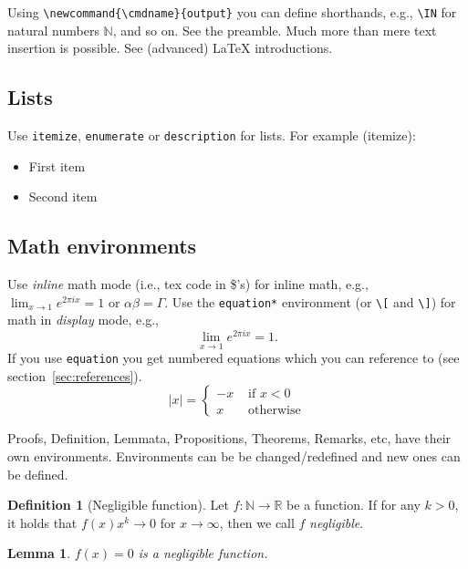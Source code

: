 \documentclass[11pt]{scrartcl}
\theoremstyle{plain} %
\newtheorem{lemma}[theorem]{Lemma}
\theoremstyle{definition} %
\newtheorem{definition}[theorem]{Definition}
\theoremstyle{remark} %
\newcommand{\IN}{\mathbb{N}} %
\newcommand{\IR}{\mathbb{R}} %
\begin{document}
Using \verb|\newcommand{\cmdname}{output}| you can define shorthands,
e.g., \verb|\IN| for natural numbers $\IN$, and so on.
See the preamble.
Much more than mere text insertion is possible.
See (advanced) \LaTeX{} introductions.

\subsection{Lists}
\label{subsec:lists}

Use \verb|itemize|, \verb|enumerate| or \verb|description| for lists.
For example (itemize):
\begin{itemize}
	\item First item
	\item Second item
\end{itemize}


\subsection{Math environments}
\label{subsec:math-env}

Use \emph{inline} math mode (i.e., tex code in \$'s) for inline math,
e.g., $\lim_{x \to 1} e^{2 \pi i x} = 1$ or $\alpha \beta = \Gamma$.
Use the \verb|equation*| environment (or \verb|\[| and \verb|\]|)
for math in \emph{display} mode, e.g.,
\begin{equation*}
	\lim_{x \to 1} e^{2 \pi i x} = 1.
\end{equation*}
If you use \verb|equation| you get numbered equations which you can reference to (see section~\ref{sec:references}).
\begin{equation}
	\label{eq:eqn}
	|x| = \left\{
	\begin{array}{rl}
		-x &\mbox{ if $x<0$} \\
		x &\mbox{ otherwise}
	\end{array}
	\right.
\end{equation}

Proofs, Definition, Lemmata, Propositions, Theorems, Remarks, etc, have their own environments.
Environments can be be changed/redefined and new ones can be defined.

\begin{definition}[Negligible function]
	\label{def:negl}
	Let $f \colon \IN \to \IR$ be a function.
	If for any $k > 0$, it holds that $f(x) x^k \rightarrow 0$ for $x \to \infty$,
	 then we call $f$ \emph{negligible}.
\end{definition}

\begin{lemma}
	$f(x) = 0$ is a negligible function.
\end{lemma}
\end{document}
